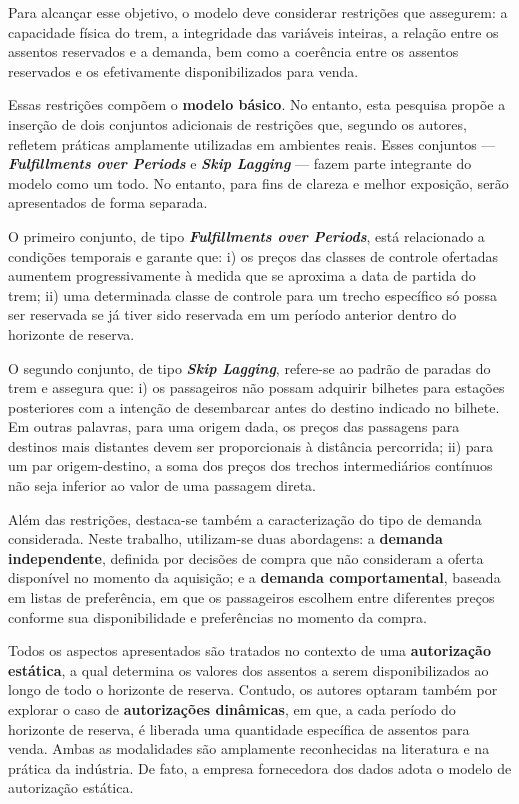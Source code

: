 Para alcançar esse objetivo, o modelo deve considerar restrições que assegurem: a capacidade física do trem, a integridade das variáveis inteiras, a relação entre os assentos reservados e a demanda, bem como a coerência entre os assentos reservados e os efetivamente disponibilizados para venda.

Essas restrições compõem o \textbf{modelo básico}. No entanto, esta pesquisa propõe a inserção de dois conjuntos adicionais de restrições que, segundo os autores, refletem práticas amplamente utilizadas em ambientes reais. Esses conjuntos — \textbf{\textit{Fulfillments over Periods}} e \textbf{\textit{Skip Lagging}} — fazem parte integrante do modelo como um todo. No entanto, para fins de clareza e melhor exposição, serão apresentados de forma separada.

O primeiro conjunto, de tipo \textbf{\textit{Fulfillments over Periods}}, está relacionado a condições temporais e garante que:
i) os preços das classes de controle ofertadas aumentem progressivamente à medida que se aproxima a data de partida do trem;
ii) uma determinada classe de controle para um trecho específico só possa ser reservada se já tiver sido reservada em um período anterior dentro do horizonte de reserva.

O segundo conjunto, de tipo \textbf{\textit{Skip Lagging}}, refere-se ao padrão de paradas do trem e assegura que:
i) os passageiros não possam adquirir bilhetes para estações posteriores com a intenção de desembarcar antes do destino indicado no bilhete. Em outras palavras, para uma origem dada, os preços das passagens para destinos mais distantes devem ser proporcionais à distância percorrida;
ii) para um par origem-destino, a soma dos preços dos trechos intermediários contínuos não seja inferior ao valor de uma passagem direta.

Além das restrições, destaca-se também a caracterização do tipo de demanda considerada. Neste trabalho, utilizam-se duas abordagens: a \textbf{demanda independente}, definida por decisões de compra que não consideram a oferta disponível no momento da aquisição; e a \textbf{demanda comportamental}, baseada em listas de preferência, em que os passageiros escolhem entre diferentes preços conforme sua disponibilidade e preferências no momento da compra.

Todos os aspectos apresentados são tratados no contexto de uma \textbf{autorização estática}, a qual determina os valores dos assentos a serem disponibilizados ao longo de todo o horizonte de reserva. Contudo, os autores optaram também por explorar o caso de \textbf{autorizações dinâmicas}, em que, a cada período do horizonte de reserva, é liberada uma quantidade específica de assentos para venda. Ambas as modalidades são amplamente reconhecidas na literatura e na prática da indústria. De fato, a empresa fornecedora dos dados adota o modelo de autorização estática.

